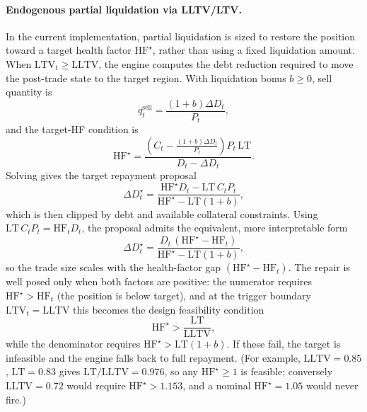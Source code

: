 \documentclass[12pt]{article}
\begin{document}
\paragraph{Endogenous partial liquidation via LLTV/LTV.}
In the current implementation, partial liquidation is sized to restore the position toward a target health factor $\mathrm{HF}^{\star}$, rather than using a fixed liquidation amount. When $\mathrm{LTV}_t\ge \mathrm{LLTV}$, the engine computes the debt reduction required to move the post-trade state to the target region. With liquidation bonus $b\ge0$, sell quantity is
\[
q_t^{\text{sell}}=\frac{(1+b)\Delta D_t}{P_t},
\]
and the target-HF condition is
\[
\mathrm{HF}^{\star}=\frac{\left(C_t-\frac{(1+b)\Delta D_t}{P_t}\right)P_t\,\mathrm{LT}}{D_t-\Delta D_t}.
\]
Solving gives the target repayment proposal
\[
\Delta D_t^{\star}=\frac{\mathrm{HF}^{\star}D_t-\mathrm{LT}\,C_tP_t}{\mathrm{HF}^{\star}-\mathrm{LT}(1+b)},
\]
which is then clipped by debt and available collateral constraints. Using $\mathrm{LT}\,C_tP_t=\mathrm{HF}_t D_t$, the proposal admits the equivalent, more interpretable form
\[
\Delta D_t^{\star}=\frac{D_t\,(\mathrm{HF}^{\star}-\mathrm{HF}_t)}{\mathrm{HF}^{\star}-\mathrm{LT}(1+b)},
\]
so the trade size scales with the health-factor gap $(\mathrm{HF}^{\star}-\mathrm{HF}_t)$. The repair is well posed only when both factors are positive: the numerator requires $\mathrm{HF}^{\star}>\mathrm{HF}_t$ (the position is below target), and at the trigger boundary $\mathrm{LTV}_t=\mathrm{LLTV}$ this becomes the design feasibility condition
\[
\mathrm{HF}^{\star}>\frac{\mathrm{LT}}{\mathrm{LLTV}},
\]
while the denominator requires $\mathrm{HF}^{\star}>\mathrm{LT}(1+b)$. If these fail, the target is infeasible and the engine falls back to full repayment. (For example, $\mathrm{LLTV}=0.85$, $\mathrm{LT}=0.83$ gives $\mathrm{LT}/\mathrm{LLTV}=0.976$, so any $\mathrm{HF}^{\star}\ge 1$ is feasible; conversely $\mathrm{LLTV}=0.72$ would require $\mathrm{HF}^{\star}>1.153$, and a nominal $\mathrm{HF}^{\star}=1.05$ would never fire.)
\end{document}
